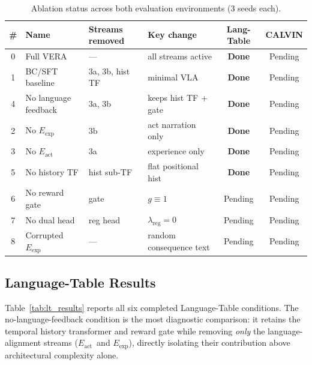 \documentclass{article}
\renewcommand{\arraystretch}{1.25}
\newcommand{\modelname}{\textsc{VERA}\xspace}
\newcommand{\Lact}{$E_{\mathrm{act}}$\xspace}
\newcommand{\Lexp}{$E_{\mathrm{exp}}$\xspace}
\begin{document}
\begin{table}[h]
\centering
\caption{Ablation status across both evaluation environments (3 seeds each).}
\label{tab:ablation_status}
\small
\renewcommand{\arraystretch}{1.15}
\begin{tabular}{clllcc}
\toprule
\textbf{\#} & \textbf{Name} & \textbf{Streams removed} & \textbf{Key change}
            & \textbf{Lang-Table} & \textbf{CALVIN} \\
\midrule
0 & Full \modelname        & —                  & all streams active    & \textbf{Done} & Pending \\
1 & BC/SFT baseline        & 3a, 3b, hist TF    & minimal VLA           & \textbf{Done} & Pending \\
4 & No language feedback   & 3a, 3b             & keeps hist TF + gate  & \textbf{Done} & Pending \\
2 & No \Lexp               & 3b                 & act narration only    & \textbf{Done} & Pending \\
3 & No \Lact               & 3a                 & experience only       & \textbf{Done} & Pending \\
5 & No history TF          & hist sub-TF        & flat positional hist  & \textbf{Done} & Pending \\
6 & No reward gate         & gate               & $g\!\equiv\!1$        & Pending & Pending \\
7 & No dual head           & reg head           & $\lambda_\mathrm{reg}{=}0$ & Pending & Pending \\
8 & Corrupted \Lexp        & —                  & random consequence text & Pending & Pending \\
\bottomrule
\end{tabular}
\end{table}

\subsection{Language-Table Results}
\label{sec:lt_results}

Table~\ref{tab:lt_results} reports all six completed Language-Table conditions.
The no-language-feedback condition is the most diagnostic comparison:
it retains the temporal history transformer and reward gate while removing
\emph{only} the language-alignment streams (\Lact\ and \Lexp), directly
isolating their contribution above architectural complexity alone.
\end{document}
